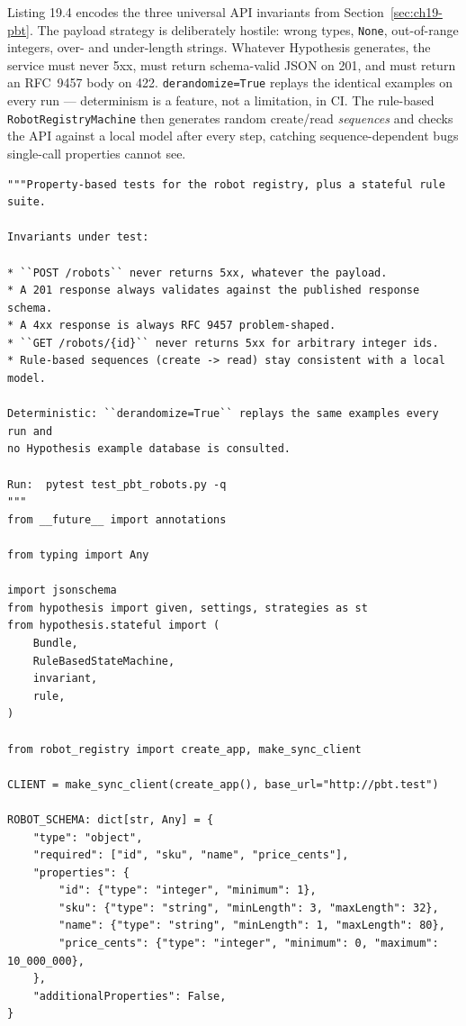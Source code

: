 Listing 19.4 encodes the three universal API invariants from
Section~\ref{sec:ch19-pbt}. The payload strategy is deliberately hostile:
wrong types, \texttt{None}, out-of-range integers, over- and under-length
strings. Whatever Hypothesis generates, the service must never 5xx, must
return schema-valid JSON on 201, and must return an RFC~9457 body on 422.
\texttt{derandomize=True} replays the identical examples on every run ---
determinism is a feature, not a limitation, in CI. The rule-based
\texttt{RobotRegistryMachine} then generates random create/read
\emph{sequences} and checks the API against a local model after every
step, catching sequence-dependent bugs single-call properties cannot see.

\begin{verbatim}
"""Property-based tests for the robot registry, plus a stateful rule suite.

Invariants under test:

* ``POST /robots`` never returns 5xx, whatever the payload.
* A 201 response always validates against the published response schema.
* A 4xx response is always RFC 9457 problem-shaped.
* ``GET /robots/{id}`` never returns 5xx for arbitrary integer ids.
* Rule-based sequences (create -> read) stay consistent with a local model.

Deterministic: ``derandomize=True`` replays the same examples every run and
no Hypothesis example database is consulted.

Run:  pytest test_pbt_robots.py -q
"""
from __future__ import annotations

from typing import Any

import jsonschema
from hypothesis import given, settings, strategies as st
from hypothesis.stateful import (
    Bundle,
    RuleBasedStateMachine,
    invariant,
    rule,
)

from robot_registry import create_app, make_sync_client

CLIENT = make_sync_client(create_app(), base_url="http://pbt.test")

ROBOT_SCHEMA: dict[str, Any] = {
    "type": "object",
    "required": ["id", "sku", "name", "price_cents"],
    "properties": {
        "id": {"type": "integer", "minimum": 1},
        "sku": {"type": "string", "minLength": 3, "maxLength": 32},
        "name": {"type": "string", "minLength": 1, "maxLength": 80},
        "price_cents": {"type": "integer", "minimum": 0, "maximum": 10_000_000},
    },
    "additionalProperties": False,
}


\end{verbatim}
